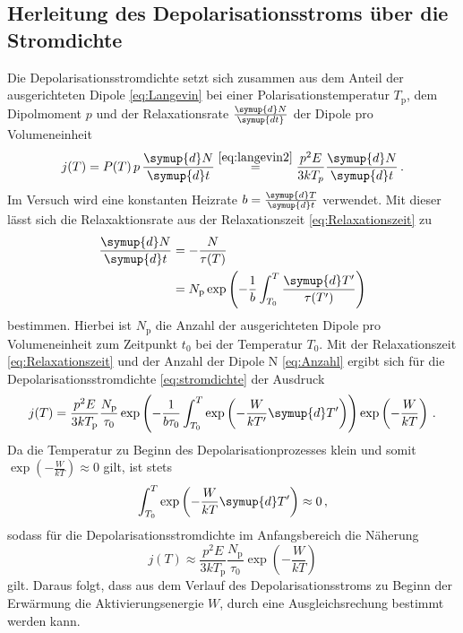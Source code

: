 \subsection{Herleitung des Depolarisationsstroms über die Stromdichte}
\label{sec:stromdichte}
Die Depolarisationsstromdichte setzt sich zusammen aus dem Anteil der ausgerichteten Dipole \eqref{eq:Langevin} bei einer Polarisationstemperatur $T_\text{p}$, dem Dipolmoment $p$ und der Relaxationsrate $\frac{\symup{d}N}{\symup{dt}}$ der Dipole pro Volumeneinheit
\begin{equation}
    j(T)=P(T)\, p \,\frac{\symup{d}N}{\symup{d}t} \stackrel{ \eqref{eq:langevin2} }{=} \frac{p^2 E}{3kT_p}\frac{\symup{d}N}{\symup{d}t} \, .
    \label{eq:stromdichte}
\end{equation}
Im Versuch wird eine konstanten Heizrate $b = \frac{\symup{d}T}{\symup{d}t}$ verwendet.
Mit dieser lässt sich die Relaxaktionsrate aus der Relaxationszeit \eqref{eq:Relaxationszeit} zu
\begin{align}
    \frac{\symup{d}N}{\symup{d}t} & = -\frac{N}{\tau(T)}\notag \\
    & = N_\text{p}\exp\left(-\frac{1}{b}\int_{T_0}^T \frac{\symup{d}T'}{\tau(T')}\right)
    \label{eq:Anzahl}
\end{align}
bestimmen.
Hierbei ist $N_\text{p}$ die Anzahl der ausgerichteten Dipole pro Volumeneinheit zum Zeitpunkt $t_0$ bei der Temperatur $T_0$.
Mit der Relaxationszeit \eqref{eq:Relaxationszeit} und der Anzahl der Dipole N \eqref{eq:Anzahl} ergibt sich für die Depolarisationsstromdichte \eqref{eq:stromdichte} der Ausdruck
\begin{equation}\label{eq:stromdichte2}
    j(T)= \frac{p^2E}{3kT_\text{p}}\frac{N_\text{p}}{\tau_0}\exp\left(-\frac{1}{b\tau_0}\int_{T_0}^T \exp\left(-\frac{W}{kT'}\symup{d}T'\right) \right)\exp\left(-\frac{W}{kT}\right)\, .
\end{equation}
Da die Temperatur zu Beginn des Depolarisationprozesses klein und somit $\exp(-\frac{W}{kT})\approx 0$ gilt, ist stets
\begin{equation*}
    \int_{T_0}^T \exp\left(-\frac{W}{kT}\symup{d}T' \right) \approx 0\, ,
\end{equation*}
sodass für die Depolarisationsstromdichte im Anfangsbereich die Näherung
\begin{equation}
    j(T) \approx \frac{p^2 E}{3kT_\text{p}}\frac{N_\text{p}}{\tau_0}\exp\left(-\frac{W}{kT}\right)
    \label{eq:anlauf}
\end{equation}
gilt.
Daraus folgt, dass aus dem Verlauf des Depolarisationsstroms zu Beginn der Erwärmung die Aktivierungsenergie $W$, durch eine Ausgleichsrechung bestimmt werden kann.